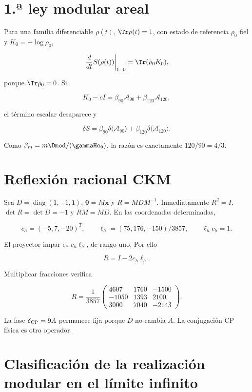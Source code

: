 \section{1.ª ley modular areal}

Para una familia diferenciable \(\rho(t)\), \(\Tr\rho(t)=1\), con estado de referencia \(\rho_0\) fiel y \(K_0=-\log\rho_0\),

\[
\left.\frac{d}{dt}S(\rho(t))\right|_{t=0}
=\Tr(\dot\rho_0K_0),
\]

porque \(\Tr\dot\rho_0=0\). Si

\[
K_0-cI=\beta_{90}\mathcal A_{90}
+\beta_{120}\mathcal A_{120},
\]

el t\'ermino escalar desaparece y

\[
\delta S=\beta_{90}\delta\langle\mathcal A_{90}\rangle
+\beta_{120}\delta\langle\mathcal A_{120}\rangle.
\]

Como \(\beta_m=m\Dmod/(\gammaH a_0)\), la raz\'on es exactamente \(120/90=4/3\).

\section{Reflexi\'on racional CKM}

Sea \(D=\operatorname{diag}(1,-1,1)\), \(\boldsymbol\theta=M\mathbf x\) y
\(R=MDM^{-1}\). Inmediatamente \(R^2=I\), \(\det R=\det D=-1\) y
\(RM=MD\). En las coordenadas determinadas,

\[
c_h=(-5,7,-20)^T,\qquad
\ell_h=(75,176,-150)/3857,\qquad \ell_hc_h=1.
\]

El proyector impar es \(c_h\ell_h\), de rango uno. Por ello

\[
R=I-2c_h\ell_h.
\]

Multiplicar fracciones verifica

\[
R=\frac1{3857}
\begin{pmatrix}
4607&1760&-1500\\
-1050&1393&2100\\
3000&7040&-2143
\end{pmatrix}.
\]

La fase \(\delta_{\rm CP}=9A\) permanece fija porque \(D\) no cambia \(A\). La conjugaci\'on CP f\'isica es otro operador.

\section{Clasificaci\'on de la realizaci\'on modular en el l\'imite infinito}

